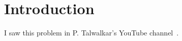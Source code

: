 \section{Introduction}
\label{sec:intro}

I saw this problem in P. Talwalkar's YouTube channel~\cite{mindyourdecisions}.
